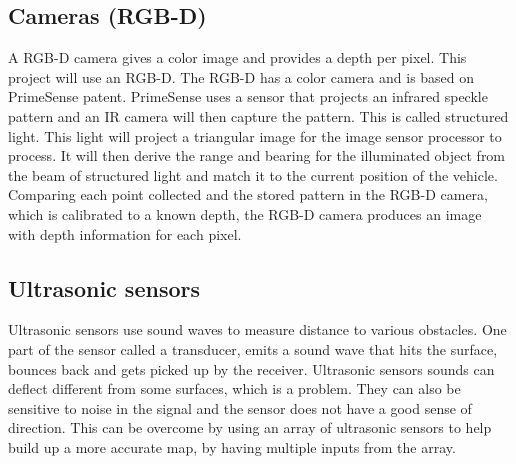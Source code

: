 \subsection{Cameras (RGB-D)} \label{ch:CameraRGB}
A RGB-D camera gives a color image and provides a depth per pixel. This project will use an RGB-D.
The RGB-D has a color camera and is based on PrimeSense patent.  
PrimeSense uses a sensor that projects an infrared speckle pattern and an IR camera will then capture the pattern. This is called structured light. This light will project a triangular image for the image sensor processor to process. It will then derive the range and bearing for the illuminated object from the beam of structured light and match it to the current position of the vehicle\cite{Lasers}.\\
Comparing each point collected and the stored pattern in the RGB-D camera, which is calibrated to a known depth, the RGB-D camera produces an image with depth information for each pixel\cite{RGB-D-new}.

\subsection{Ultrasonic sensors}
Ultrasonic sensors use sound waves to measure distance to various obstacles. One part of the sensor called a transducer, emits a sound wave that hits the surface, bounces back and gets picked up by the receiver. 
Ultrasonic sensors sounds can deflect different from some surfaces, which is a problem. They can also be sensitive to noise in the signal and the sensor does not have a good sense of direction. This can be overcome by using an array of ultrasonic sensors to help build up a more accurate map, by having multiple inputs from the array\cite{Ultrasonicsnesor}.

